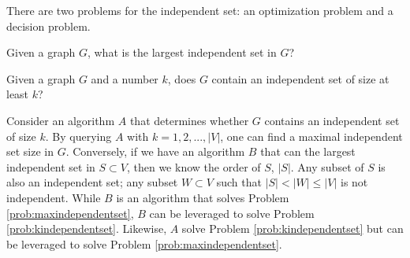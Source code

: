 There are two problems for the independent set: an optimization problem and a decision problem.
\begin{prob}\label{prob:maxindependentset}
Given a graph $G$, what is the largest independent set in $G$?
\end{prob}
\begin{prob}\label{prob:kindependentset}
Given a graph $G$ and a number $k$, does $G$ contain an independent set of size at least $k$?
\end{prob}
Consider an algorithm $A$ that determines whether $G$ contains an independent set of size $k$.  
By querying $A$ with $k=1,2,...,\vert V \vert$, one can find a maximal independent set size in $G$.
Conversely, if we have an algorithm $B$ that can the largest independent set in $S \subset V$, then we know the order of $S$, $\vert S\vert$.  
Any subset of $S$ is also an independent set; any subset $W \subset V$ such that $\vert S \vert < \vert W \vert \leq \vert V \vert$ is not independent.  
While $B$ is an algorithm that solves Problem \ref{prob:maxindependentset}, $B$ can be leveraged to solve Problem \ref{prob:kindependentset}.  
Likewise, $A$ solve Problem \ref{prob:kindependentset} but can be leveraged to solve Problem \ref{prob:maxindependentset}.
